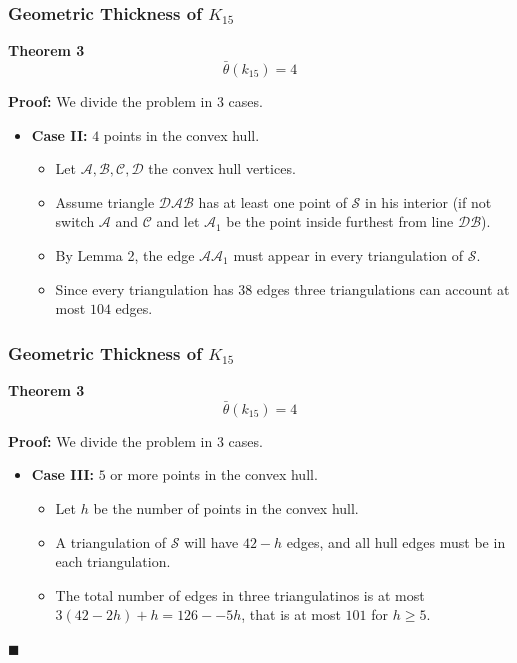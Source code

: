 \documentclass[12 pt]{beamer}
\begin{document}
\begin{frame}{}
    \frametitle{Geometric Thickness of $K_{15}$}
    
    \begin{block}{\textbf{Theorem 3}}
    $$\bar{\theta} (k_{15}) = 4 $$
    \end{block}

    \textbf{Proof:}
    We divide the problem in $3$ cases.
    
    \begin{itemize}
    \item \textbf{Case II:} $4$ points in the convex hull. 
        \begin{itemize}
            \item Let $\mathcal{A, B, C, D}$ the convex hull vertices.
            \item Assume triangle $\mathcal{DAB}$ has at least one point of $\mathcal{S}$ in his interior (if not switch $\mathcal{A}$ and $\mathcal{C}$ and let $\mathcal{A}_{1}$ be the point inside furthest from line $\mathcal{DB}$).
            \item By Lemma 2, the edge $\mathcal{AA}_{1}$ must appear in every triangulation of $\mathcal{S}$.
            \item Since every triangulation has $38$ edges three triangulations can account at most $104$ edges.
        \end{itemize}
    \end{itemize}
\end{frame} 

\begin{frame}{}
    \frametitle{Geometric Thickness of $K_{15}$}
    
    \begin{block}{\textbf{Theorem 3}}
    $$\bar{\theta} (k_{15}) = 4 $$
    \end{block}

    \textbf{Proof:}
    We divide the problem in $3$ cases.
    
    \begin{itemize}
    \item \textbf{Case III:} $5$ or more points in the convex hull. 
        \begin{itemize}
            \item Let $h$ be the number of points in the convex hull.
            \item A triangulation of $\mathcal{S}$ will have $42 - h$ edges, and all hull edges must be in each triangulation.
            \item The total number of edges in three triangulatinos is at most $3(42 -  2h) + h = 126 - -5h$, that is at most $101$ for $h \geq 5$.
        \end{itemize}
    \end{itemize}
    
    \begin{flushright}
    $\blacksquare$
    \end{flushright}
\end{frame} 
\end{document}
